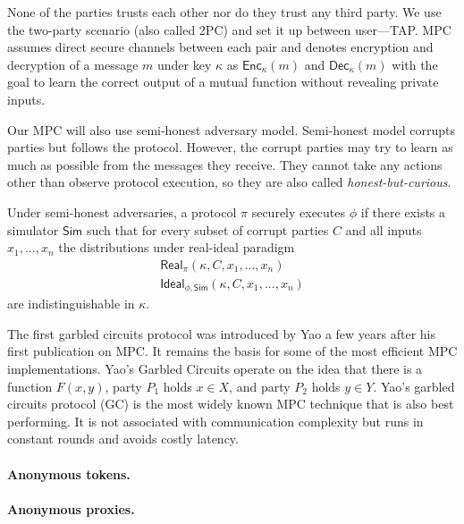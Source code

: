 None of the parties trusts each other nor do they trust any third party. We use
the two-party scenario (also called 2PC) and set it up between user---TAP. MPC
assumes direct secure channels between each pair and denotes encryption and
decryption of a message $m$ under key $\kappa$ as $\mathsf{Enc}_\kappa(m)$ and
$\mathsf{Dec}_\kappa(m)$ with the goal to learn the correct output of a mutual
function without revealing private inputs.

Our MPC will also use semi-honest adversary model. Semi-honest model corrupts
parties but follows the protocol. However, the corrupt parties may try to learn
as much as possible from the messages they receive. They cannot take any actions
other than observe protocol execution, so they are also called
\emph{honest-but-curious}.

Under semi-honest adversaries, a protocol $\pi$ securely executes $\phi$ if
there exists a simulator $\mathsf{Sim}$ such that for every subset of corrupt
parties $C$ and all inputs $x_1, ..., x_n$ the distributions under real-ideal
paradigm
\begin{gather*}
  \mathsf{Real}_{\pi}(\kappa, C, x_1, ..., x_n) \\
  \mathsf{Ideal}_{\phi, \mathsf{Sim}} (\kappa, C, x_1, ..., x_n)
\end{gather*} 
are indistinguishable in $\kappa$.

The first garbled circuits protocol was introduced by Yao a few years after his
first publication on MPC. It remains the basis for some of the most efficient
MPC implementations. Yao's Garbled Circuits operate on the idea that there is a
function $F(x,y)$, party $P_1$ holds $x \in X$, and party $P_2$ holds $y \in Y$.
Yao's garbled circuits protocol (GC) is the most widely known MPC technique that
is also best performing. It is not associated with communication complexity but
runs in constant rounds and avoids costly latency.

\paragraph{Anonymous tokens.}

\paragraph{Anonymous proxies.}
